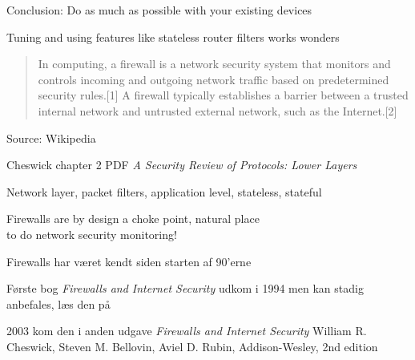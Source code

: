 \documentclass[Screen16to9,17pt]{foils}
\begin{document}


\begin{list1}
\item Conclusion: Do as much as possible with your existing devices
\item Tuning and using features like stateless router filters works wonders
\end{list1}



\begin{quote}
In computing, a firewall is a network security system that monitors and controls incoming and outgoing network traffic based on predetermined security rules.[1] A firewall typically establishes a barrier between a trusted internal network and untrusted external network, such as the Internet.[2]
\end{quote} Source: Wikipedia

\begin{list1}
\item {}
\item {} Cheswick chapter 2 PDF
\emph{A Security Review of Protocols:
Lower Layers}
\begin{list2}
\item Network layer, packet filters, application level, stateless, stateful
\end{list2}
\end{list1}

\Large Firewalls are by design a choke point, natural place \\
to do network security monitoring!




\begin{list1}
\item Firewalls har været kendt siden starten af 90'erne
\item Første bog \emph{Firewalls and Internet Security} udkom i 1994 men kan stadig anbefales, læs den på 

\item 2003 kom den i anden udgave \emph{Firewalls and Internet Security}
William R. Cheswick, Steven M. Bellovin, Aviel D. Rubin,
Addison-Wesley, 2nd edition
\end{list1}
\end{document}

